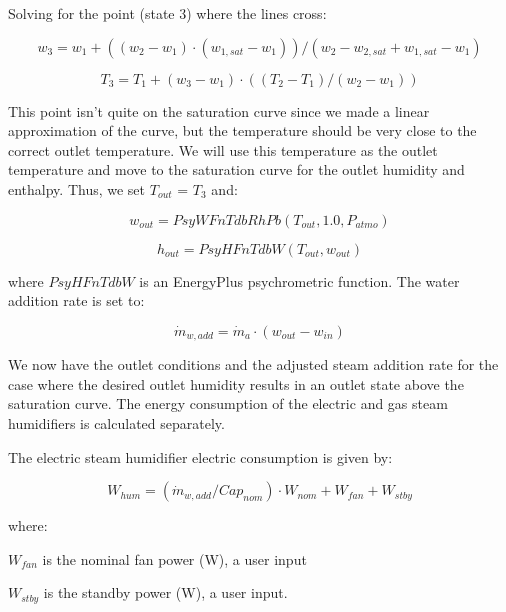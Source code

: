 Solving for the point (state 3) where the lines cross:

\begin{equation}
{w_3} = {w_1} + (({w_2} - {w_1}) \cdot ({w_{1,sat}} - {w_1}))/({w_2} - {w_{2,sat}} + {w_{1,sat}} - {w_1})
\end{equation}

\begin{equation}
{T_3} = {T_1} + ({w_3} - {w_1}) \cdot (({T_2} - {T_1})/({w_2} - {w_1}))
\end{equation}

This point isn't quite on the saturation curve since we made a linear approximation of the curve, but the temperature should be very close to the correct outlet temperature. We will use this temperature as the outlet temperature and move to the saturation curve for the outlet humidity and enthalpy. Thus, we set \({T_{out}}\) = \({T_3}\) and:

\begin{equation}
{w_{out}} = PsyWFnTdbRhPb({T_{out}},1.0,{P_{atmo}})
\end{equation}

\begin{equation}
{h_{out}} = PsyHFnTdbW({T_{out}},{w_{out}})
\end{equation}

where \(PsyHFnTdbW\) is an EnergyPlus psychrometric function. The water addition rate is set to:

\begin{equation}
{\dot m_{w,add}} = {\dot m_a} \cdot ({w_{out}} - {w_{in}})
\end{equation}

We now have the outlet conditions and the adjusted steam addition rate for the case where the desired outlet humidity results in an outlet state above the saturation curve. The energy consumption of the electric and gas steam humidifiers is calculated separately.

The electric steam humidifier electric consumption is given by:

\begin{equation}
{W_{hum}} = ({\dot m_{w,add}}/Ca{p_{nom}}) \cdot {W_{nom}} + {W_{fan}} + {W_{stby}}
\end{equation}

where:

\({W_{fan}}\) is the nominal fan power (W), a user input

\({W_{stby}}\) is the standby power (W), a user input.

